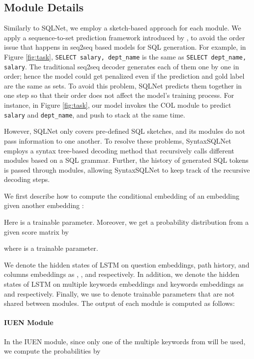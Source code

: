 \documentclass[11pt,a4paper]{article}
\begin{document}
\subsection{Module Details}

Similarly to SQLNet, we employ a sketch-based approach for each module. We apply a sequence-to-set prediction framework introduced by \cite{Xu2017}, to avoid the order issue that happens in seq2seq based models for SQL generation.
For example, in Figure \ref{fig:task}, \texttt{SELECT salary, dept\_name} is the same as \texttt{SELECT dept\_name, salary}.
The traditional seq2seq decoder generates each of them one by one in order; hence the model could get penalized even if the prediction and gold label are the same as sets.
To avoid this problem, SQLNet predicts them together in one step so that their order does not affect the model's training process.
For instance, in Figure \ref{fig:task}, our model invokes the COL module to predict \texttt{salary} and \texttt{dept\_name}, and push to stack at the same time.

However, SQLNet only covers pre-defined SQL sketches, and its modules do not pass information to one another. 
To resolve these problems, SyntaxSQLNet employs a syntax tree-based decoding method that recursively calls different modules based on a SQL grammar. Further, the history of generated SQL tokens is passed through modules, allowing SyntaxSQLNet to keep track of the recursive decoding steps.


We first describe how to compute the conditional embedding  of an embedding  given another embedding :

Here  is a trainable parameter.
Moreover, we get a probability distribution from a given score matrix  by

where  is a trainable parameter. 

We denote the hidden states of LSTM on question embeddings, path history, and columns embeddings as , , and  respectively. In addition, we denote the hidden states of LSTM on multiple keywords embeddings and keywords embeddings as  and  respectively. Finally, we use 
 to denote trainable parameters that are not shared between modules. The output of each module is computed as follows:

\paragraph{IUEN Module}
In the IUEN module, since only one of the multiple keywords from  will be used, we compute the probabilities by
\end{document}
